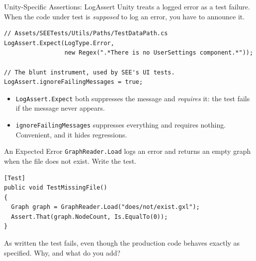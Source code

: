 \begin{frame}[fragile]{Unity-Specific Assertions: LogAssert}
  Unity treats a logged error as a test failure. When the code under test is
  \emph{supposed} to log an error, you have to announce it.
  \vspace{0.5ex}

  \begin{lstlisting}[basicstyle=\scriptsize\ttfamily]
// Assets/SEETests/Utils/Paths/TestDataPath.cs
LogAssert.Expect(LogType.Error,
                 new Regex(".*There is no UserSettings component.*"));

// The blunt instrument, used by SEE's UI tests.
LogAssert.ignoreFailingMessages = true;
  \end{lstlisting}
  \vspace{0.5ex}

  \begin{itemize}
    \item \texttt{LogAssert.Expect} both suppresses the message and
      \emph{requires} it: the test fails if the message never appears.
    \item \texttt{ignoreFailingMessages} suppresses everything and requires
      nothing. Convenient, and it hides regressions.
  \end{itemize}
  \vspace{1ex}

\end{frame}

\begin{exerciseframe}{An Expected Error}
  \texttt{GraphReader.Load} logs an error and returns an empty graph when the
  file does not exist. Write the test.
  \vspace{1ex}

  \begin{lstlisting}[basicstyle=\scriptsize\ttfamily]
[Test]
public void TestMissingFile()
{
  Graph graph = GraphReader.Load("does/not/exist.gxl");
  Assert.That(graph.NodeCount, Is.EqualTo(0));
}
  \end{lstlisting}
  \vspace{1ex}

  As written the test fails, even though the production code behaves exactly as
  specified. Why, and what do you add?
\end{exerciseframe}

